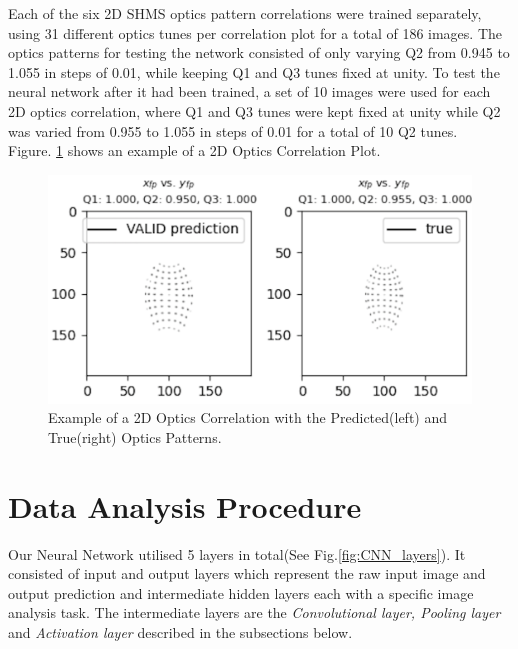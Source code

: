 \documentclass[conference]{IEEEtran}
\begin{document}
Each of the six 2D SHMS optics pattern correlations were trained separately, using 31 different optics tunes
per correlation plot for a total of 186 images. The optics patterns for testing the network consisted of only
varying Q2 from 0.945 to 1.055 in steps of 0.01, while keeping Q1 and Q3 tunes fixed at unity.
To test the neural network after it had been trained, a set of 10 images were used for each 2D optics correlation, where Q1 and Q3
tunes were kept fixed at unity while Q2 was varied from 0.955 to 1.055 in steps of 0.01 for a total of 10 Q2 tunes.\\ Figure. \ref{fig:2d_correlation2} shows an example of a 2D Optics Correlation Plot.


\begin{figure}[h]
 \centering
  \includegraphics[scale=0.2]{images/2d_correlation2.png}
  \caption{Example of a 2D Optics Correlation with the Predicted(left) and True(right) Optics Patterns.}
  \label{fig:2d_correlation2}
\end{figure}





\section{Data Analysis Procedure}



\indent Our Neural Network utilised 5 layers in total(See Fig.\ref{fig:CNN_layers}). It consisted of input and output layers which represent the raw input image and output prediction and intermediate hidden layers each with a specific image analysis task. The intermediate layers are the \emph{Convolutional layer, Pooling layer} and \emph{Activation layer} described in the subsections below.\\
\end{document}
